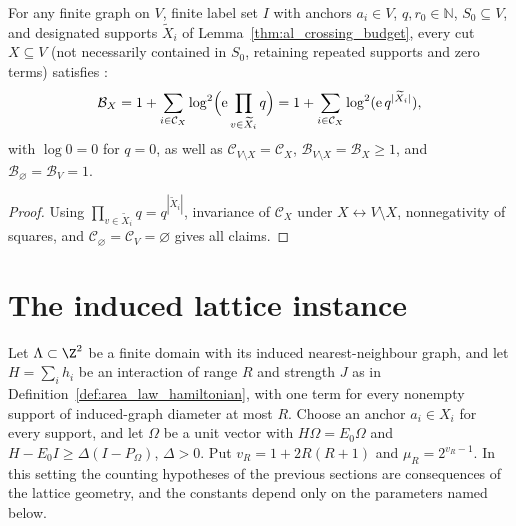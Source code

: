 \begin{lemma}
    \label{thm:al_exact_cut_budget}
    \leanok
    For any finite graph on $V$, finite label set $I$ with anchors $a_i\in V$,
    $q,r_0\in\mathbb N$, $S_0\subseteq V$, and designated supports
    $\widetilde X_i$ of Lemma~\ref{thm:al_crossing_budget}, every cut
    $X\subseteq V$ (not necessarily contained in $S_0$, retaining repeated
    supports and zero terms) satisfies \cite[Lemma~3.1]{OpenAI2026AreaLaw}:
    \begin{align}
        \mathcal B_X
        =1+\sum_{i\in\mathcal C_X}
        \log^2\Bigl(\mathrm e\prod_{v\in\widetilde X_i}q\Bigr)
        =1+\sum_{i\in\mathcal C_X}\log^2(\mathrm e\,q^{|\widetilde X_i|}),
        \label{eq:al_exact_cut_budget}
    \end{align}
    with $\log0=0$ for $q=0$, as well as
    $\mathcal C_{V\setminus X}=\mathcal C_X$,
    $\mathcal B_{V\setminus X}=\mathcal B_X\ge1$, and
    $\mathcal B_\varnothing=\mathcal B_V=1$.
\end{lemma}
\begin{proof}\leanok
    Using $\prod_{v\in\widetilde X_i}q=q^{|\widetilde X_i|}$, invariance of
    $\mathcal C_X$ under $X\leftrightarrow V\setminus X$, nonnegativity of
    squares, and $\mathcal C_\varnothing=\mathcal C_V=\varnothing$ gives all
    claims.
\end{proof}

\section{The induced lattice instance}
\label{sec:al_lattice_constraints}

Let $\Lambda\subset\Z^2$ be a finite domain with its induced nearest-neighbour
graph, and let $H=\sum_ih_i$ be an interaction of range $R$ and strength $J$ as
in Definition~\ref{def:area_law_hamiltonian}, with one term for every nonempty
support of induced-graph diameter at most $R$. Choose an anchor $a_i\in X_i$
for every support, and let $\Omega$ be a unit vector with $H\Omega=E_0\Omega$
and $H-E_0I\ge\Delta(I-P_\Omega)$, $\Delta>0$. Put $v_R=1+2R(R+1)$ and
$\mu_R=2^{v_R-1}$. In this setting the counting hypotheses of the previous
sections are consequences of the lattice geometry, and the constants depend
only on the parameters named below.

